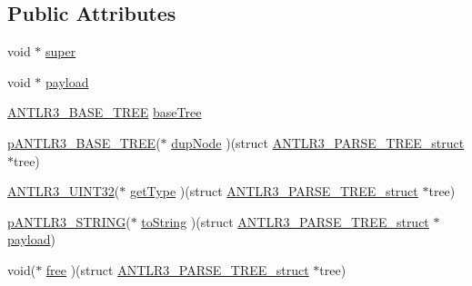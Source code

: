 \subsection*{Public Attributes}
\begin{DoxyCompactItemize}
\item 
void $\ast$ \hyperlink{struct_a_n_t_l_r3___p_a_r_s_e___t_r_e_e__struct_a1170ffff19fe53a48dc3cad2b56babeb}{super}
\item 
void $\ast$ \hyperlink{struct_a_n_t_l_r3___p_a_r_s_e___t_r_e_e__struct_ac014f0f8331803c4fa11bc196bbcb052}{payload}
\item 
\hyperlink{antlr3basetree_8h_a7b4311ecc7fa341cd6211cac3236738f}{A\-N\-T\-L\-R3\-\_\-\-B\-A\-S\-E\-\_\-\-T\-R\-E\-E} \hyperlink{struct_a_n_t_l_r3___p_a_r_s_e___t_r_e_e__struct_adf29cfa8ac886a0292c8ec5e21859a65}{base\-Tree}
\item 
\hyperlink{antlr3interfaces_8h_a6313a8a3e8f044398a393bd10c083852}{p\-A\-N\-T\-L\-R3\-\_\-\-B\-A\-S\-E\-\_\-\-T\-R\-E\-E}($\ast$ \hyperlink{struct_a_n_t_l_r3___p_a_r_s_e___t_r_e_e__struct_a164cc1d674b62141c5ef0fda35107077}{dup\-Node} )(struct \hyperlink{struct_a_n_t_l_r3___p_a_r_s_e___t_r_e_e__struct}{A\-N\-T\-L\-R3\-\_\-\-P\-A\-R\-S\-E\-\_\-\-T\-R\-E\-E\-\_\-struct} $\ast$tree)
\item 
\hyperlink{antlr3defs_8h_ac41f744abd0fd25144b9eb9d11b1dfd1}{A\-N\-T\-L\-R3\-\_\-\-U\-I\-N\-T32}($\ast$ \hyperlink{struct_a_n_t_l_r3___p_a_r_s_e___t_r_e_e__struct_a409c3365960de7a7e06ee2f98fc067df}{get\-Type} )(struct \hyperlink{struct_a_n_t_l_r3___p_a_r_s_e___t_r_e_e__struct}{A\-N\-T\-L\-R3\-\_\-\-P\-A\-R\-S\-E\-\_\-\-T\-R\-E\-E\-\_\-struct} $\ast$tree)
\item 
\hyperlink{antlr3interfaces_8h_a36bbe7362079348864db4b4dbdcce56b}{p\-A\-N\-T\-L\-R3\-\_\-\-S\-T\-R\-I\-N\-G}($\ast$ \hyperlink{struct_a_n_t_l_r3___p_a_r_s_e___t_r_e_e__struct_a58505143179c17cd36041a6d2688e1ec}{to\-String} )(struct \hyperlink{struct_a_n_t_l_r3___p_a_r_s_e___t_r_e_e__struct}{A\-N\-T\-L\-R3\-\_\-\-P\-A\-R\-S\-E\-\_\-\-T\-R\-E\-E\-\_\-struct} $\ast$\hyperlink{struct_a_n_t_l_r3___p_a_r_s_e___t_r_e_e__struct_ac014f0f8331803c4fa11bc196bbcb052}{payload})
\item 
void($\ast$ \hyperlink{struct_a_n_t_l_r3___p_a_r_s_e___t_r_e_e__struct_aff34d95f433312b2483b89082fb598c9}{free} )(struct \hyperlink{struct_a_n_t_l_r3___p_a_r_s_e___t_r_e_e__struct}{A\-N\-T\-L\-R3\-\_\-\-P\-A\-R\-S\-E\-\_\-\-T\-R\-E\-E\-\_\-struct} $\ast$tree)
\end{DoxyCompactItemize}


